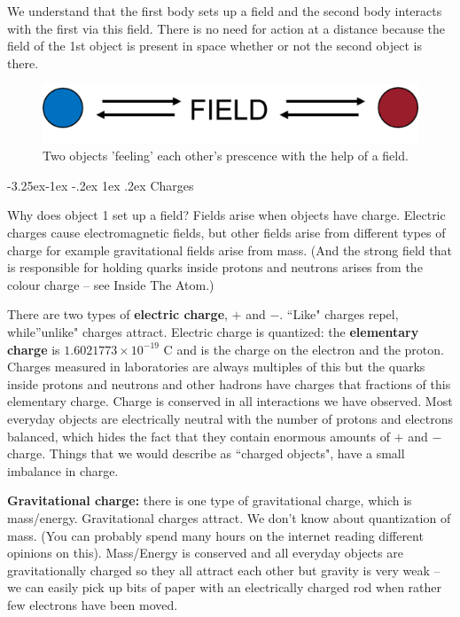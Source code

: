 \documentclass[
]{book}
\makeatletter
\renewcommand\subsection{%
\@startsection{subsection}{2}{\z@}%
              {-3.25ex\@plus -1ex \@minus -.2ex}%
              {1ex \@plus .2ex}%
              {\sffamily\bfseries}}
\numberwithin{equation}{section}
\makeatother
\begin{document}
We understand that the first body sets up a field and the second body
interacts with the first via this field. There is no need for action at
a distance because the field of the 1st object is present in space
whether or not the second object is there.

\begin{figure}

{\centering \includegraphics[width=0.7\linewidth]{Figures/blue_red_FIELD} 

}

\caption{Two objects 'feeling' each other's prescence with the help of a field.}\label{fig:blueredField}
\end{figure}

\hypertarget{charges}{%
\subsection{Charges}\label{charges}}

Why does object 1 set up a field? Fields arise when objects have charge.
Electric charges cause electromagnetic fields, but other fields arise
from different types of charge for example gravitational fields arise
from mass. (And the strong field that is responsible for holding quarks
inside protons and neutrons arises from the colour charge -- see Inside
The Atom.)

There are two types of \textbf{electric charge}, \(+\) and \(-\). ``Like" charges
repel, while''unlike" charges attract. Electric charge is quantized:
the \textbf{elementary charge} is \(1.6021773 \times 10^{-19}\) C and is the
charge on the electron and the proton. Charges measured in laboratories
are always multiples of this but the quarks inside protons and neutrons
and other hadrons have charges that fractions of this elementary charge.
Charge is conserved in all interactions we have observed. Most everyday
objects are electrically neutral with the number of protons and
electrons balanced, which hides the fact that they contain enormous
amounts of \(+\) and \(-\) charge. Things that we would describe as ``charged
objects", have a small imbalance in charge.

\textbf{Gravitational charge:} there is one type of gravitational charge,
which is mass/energy. Gravitational charges attract. We don't know about
quantization of mass. (You can probably spend many hours on the internet
reading different opinions on this). Mass/Energy is conserved and all
everyday objects are gravitationally charged so they all attract each
other but gravity is very weak -- we can easily pick up bits of paper
with an electrically charged rod when rather few electrons have been
moved.
\end{document}
